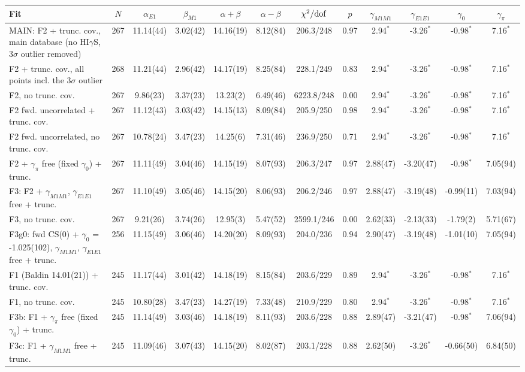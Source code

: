 
\begin{tabular}{lccccccccccc}
\hline
Fit & $N$ & $\alpha_{E1}$ & $\beta_{M1}$ & $\alpha+\beta$ & $\alpha-\beta$ & $\chi^2/{\rm dof}$ & $p$ & $\gamma_{M1M1}$ & $\gamma_{E1E1}$ & $\gamma_0$ & $\gamma_\pi$ \\
\hline
MAIN: F2 + trunc. cov., main database (no HI$\gamma$S, 3$\sigma$ outlier removed) & 267 & 11.14(44) & 3.02(42) & 14.16(19) & 8.12(84) & 206.3/248 & 0.97 & 2.94$^*$ & -3.26$^*$ & -0.98$^*$ & 7.16$^*$ \\
F2 + trunc. cov., all points incl. the 3$\sigma$ outlier & 268 & 11.21(44) & 2.96(42) & 14.17(19) & 8.25(84) & 228.1/249 & 0.83 & 2.94$^*$ & -3.26$^*$ & -0.98$^*$ & 7.16$^*$ \\
F2, no trunc. cov. & 267 & 9.86(23) & 3.37(23) & 13.23(2) & 6.49(46) & 6223.8/248 & 0.00 & 2.94$^*$ & -3.26$^*$ & -0.98$^*$ & 7.16$^*$ \\
F2 fwd. uncorrelated + trunc. cov. & 267 & 11.12(43) & 3.03(42) & 14.15(13) & 8.09(84) & 205.9/250 & 0.98 & 2.94$^*$ & -3.26$^*$ & -0.98$^*$ & 7.16$^*$ \\
F2 fwd. uncorrelated, no trunc. cov. & 267 & 10.78(24) & 3.47(23) & 14.25(6) & 7.31(46) & 236.9/250 & 0.71 & 2.94$^*$ & -3.26$^*$ & -0.98$^*$ & 7.16$^*$ \\
F2 + $\gamma_\pi$ free (fixed $\gamma_0$) + trunc. & 267 & 11.11(49) & 3.04(46) & 14.15(19) & 8.07(93) & 206.3/247 & 0.97 & 2.88(47) & -3.20(47) & -0.98$^*$ & 7.05(94) \\
F3: F2 + $\gamma_{M1M1}$, $\gamma_{E1E1}$ free + trunc. & 267 & 11.10(49) & 3.05(46) & 14.15(20) & 8.06(93) & 206.2/246 & 0.97 & 2.88(47) & -3.19(48) & -0.99(11) & 7.03(94) \\
F3, no trunc. cov. & 267 & 9.21(26) & 3.74(26) & 12.95(3) & 5.47(52) & 2599.1/246 & 0.00 & 2.62(33) & -2.13(33) & -1.79(2) & 5.71(67) \\
F3g0: fwd CS(0) + $\gamma_0$ = -1.025(102), $\gamma_{M1M1}$, $\gamma_{E1E1}$ free + trunc. & 256 & 11.15(49) & 3.06(46) & 14.20(20) & 8.09(93) & 204.0/236 & 0.94 & 2.90(47) & -3.19(48) & -1.01(10) & 7.05(94) \\
F1 (Baldin 14.01(21)) + trunc. cov. & 245 & 11.17(44) & 3.01(42) & 14.18(19) & 8.15(84) & 203.6/229 & 0.89 & 2.94$^*$ & -3.26$^*$ & -0.98$^*$ & 7.16$^*$ \\
F1, no trunc. cov. & 245 & 10.80(28) & 3.47(23) & 14.27(19) & 7.33(48) & 210.9/229 & 0.80 & 2.94$^*$ & -3.26$^*$ & -0.98$^*$ & 7.16$^*$ \\
F3b: F1 + $\gamma_\pi$ free (fixed $\gamma_0$) + trunc. & 245 & 11.14(49) & 3.03(46) & 14.18(19) & 8.11(93) & 203.6/228 & 0.88 & 2.89(47) & -3.21(47) & -0.98$^*$ & 7.06(94) \\
F3c: F1 + $\gamma_{M1M1}$ free + trunc. & 245 & 11.09(46) & 3.07(43) & 14.15(20) & 8.02(87) & 203.1/228 & 0.88 & 2.62(50) & -3.26$^*$ & -0.66(50) & 6.84(50) \\
\hline
\end{tabular}

